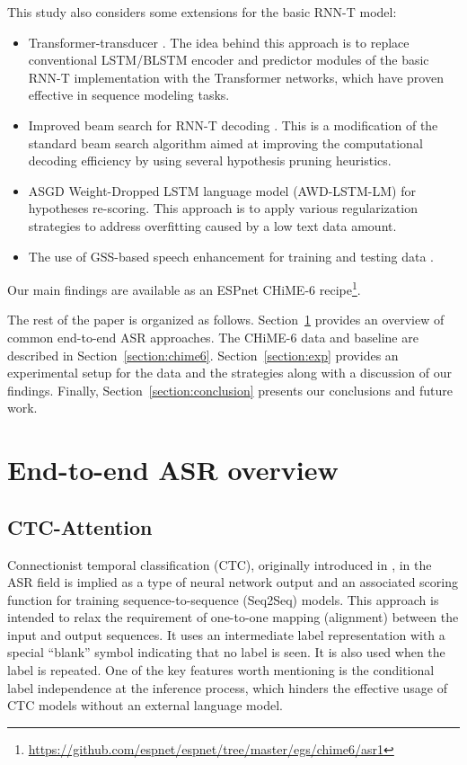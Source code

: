 \documentclass[a4paper]{article}
\begin{document}
This study also considers some extensions for the basic RNN-T model:
\begin{itemize}
    \item Transformer-transducer \cite{Tian_2019,yeh2019transformertransducer}. The idea behind this approach is to replace conventional LSTM/BLSTM encoder and predictor modules of the basic RNN-T implementation with the Transformer networks, which have proven effective in sequence modeling tasks.
    \item Improved beam search for RNN-T decoding \cite{jain2019rnnt}. This is a modification of the standard beam search algorithm aimed at improving the computational decoding efficiency by using several hypothesis pruning heuristics.
    \item ASGD Weight-Dropped LSTM language model (AWD-LSTM-LM) \cite{merity2017regularizing} for hypotheses re-scoring. This approach is to apply various regularization strategies to address overfitting caused by a low text data amount.
    \item The use of GSS-based speech enhancement for training and testing data \cite{zorila_investigation_2019,Medennikov_chime6}.
\end{itemize}

Our main findings are available as an ESPnet CHiME-6 recipe\footnote{\url{https://github.com/espnet/espnet/tree/master/egs/chime6/asr1}}.

The rest of the paper is organized as follows. Section~\ref{section:e2e} provides an overview of common end-to-end ASR approaches. The CHiME-6 data and baseline are described in Section~\ref{section:chime6}. Section~\ref{section:exp} provides an experimental setup for the data and the strategies along with a discussion of our findings. Finally, Section~\ref{section:conclusion} presents our conclusions and future work.

\section{End-to-end ASR overview}
\label{section:e2e}

\subsection{CTC-Attention}

Connectionist temporal classification (CTC), originally introduced in \cite{graves_connectionist_2006}, in the ASR field is implied as a type of neural network output and an associated scoring function for training sequence-to-sequence (Seq2Seq) models. This approach is intended to relax the requirement of one-to-one mapping (alignment) between the input and output sequences. It uses an intermediate label representation with a special ``blank'' symbol indicating that no label is seen. It is also used when the label is repeated. One of the key features worth mentioning is the conditional label independence at the inference process, which hinders the effective usage of CTC models without an external language model.
\end{document}
